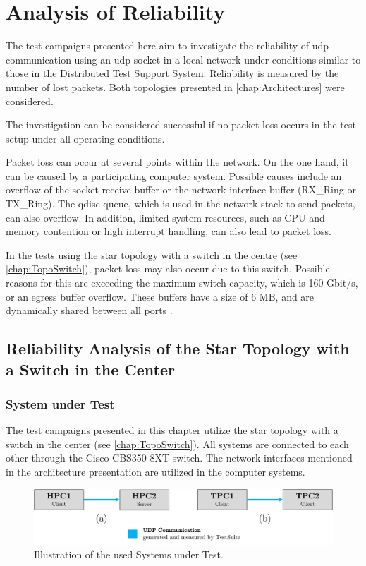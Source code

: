 \chapter{Analysis of Reliability}

The test campaigns presented here aim to investigate the reliability of \ac{udp} communication using an \ac{udp} socket in a local network under conditions similar to those in the Distributed Test Support System. Reliability is measured by the number of lost packets. Both topologies presented in \ref{chap:Architectures} were considered.

The investigation can be considered successful if no packet loss occurs in the test setup under all operating conditions.

Packet loss can occur at several points within the network. On the one hand, it can be caused by a participating computer system. Possible causes include an overflow of the socket receive buffer or the network interface buffer (RX\_Ring or TX\_Ring). The \ac{qdisc} queue, which is used in the network stack to send packets, can also overflow. In addition, limited system resources, such as \ac{CPU} and memory contention or high interrupt handling, can also lead to packet loss.

In the tests using the star topology with a switch in the centre (see \ref{chap:TopoSwitch}), packet loss may also occur due to this switch. Possible reasons for this are exceeding the maximum switch capacity, which is 160 Gbit/s, or an egress buffer overflow. These buffers have a size of 6 MB, and are dynamically shared between all ports \cite{setup09}.

\clearpage
\section{Reliability Analysis of the Star Topology with a Switch in the Center} \label{chap:switchtest}

\subsection{System under Test}
The test campaigns presented in this chapter utilize the star topology with a switch in the center (see \ref{chap:TopoSwitch}). All systems are connected to each other through the Cisco CBS350-8XT switch. The network interfaces mentioned in the architecture presentation are utilized in the computer systems.

\begin{figure}[h!]
    \centering
    \includegraphics[width=1\linewidth]{figures/reliability/star/rel_g_1.pdf}
    \caption{Illustration of the used Systems under Test.}
    \label{fig:sutreliability}
\end{figure}

